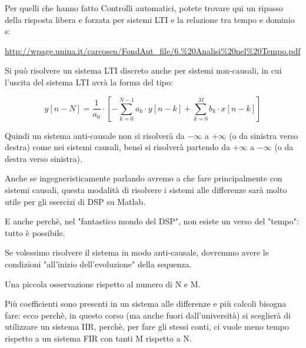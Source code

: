\begin{tcolorbox}
    Per quelli che hanno fatto Controlli automatici, potete trovare qui un ripasso della risposta libera e forzata per sistemi LTI e la relazione tra tempo e dominio s: \newline 

    \url{http://wpage.unina.it/carcosen/FondAut_file/6.%20Analisi%20nel%20Tempo.pdf} \newline 

    Si può risolvere un sistema LTI discreto anche per sistemi non-causali, in cui l'uscita del sistema LTI avrà la forma del tipo: 

    {
    \Large 
    \begin{equation}
        y \left[ n - N\right]
        = 
        \dfrac{1}{a_0} 
        \cdot
        \left[ 
            - \sum_{k = 0}^{N - 1} a_k \cdot y [n - k]
            + 
            \sum_{k = 0}^{M} b_k \cdot x [n - k] 
        \right]
    \end{equation}
} 

Quindi un sistema anti-causale non si risolverà da $- \infty$ a $+ \infty$ (o da sinistra verso destra) come nei sistemi causali, 
bensì si risolverà partendo da $+ \infty$ a $- \infty$ (o da destra verso sinistra). \newline 

Anche se ingegneristicamente parlando avremo a che fare principalmente con sistemi causali, questa modalità di risolvere i sistemi alle differenze sarà molto utile per gli esercizi di DSP su Matlab. \newline 

E anche perchè, nel "fantastico mondo del DSP", non esiste un verso del "tempo": tutto è possibile. 
\end{tcolorbox}

Se volessimo risolvere il sistema in modo anti-causale, dovremmo avere le condizioni "all'inizio dell'evoluzione" della sequenza. \newline 

\begin{tcolorbox}
Una piccola osservazione rispetto al numero di N e M. \newline 

Più coefficienti sono presenti in un sistema alle differenze  e più calcoli bisogna fare: ecco perchè, in questo corso (ma anche fuori dall'università) si sceglierà di utilizzare un sistema IIR, 
perchè, per fare gli stessi conti, ci vuole meno tempo rispetto a un sistema FIR con tanti M rispetto a N.    
\end{tcolorbox}

